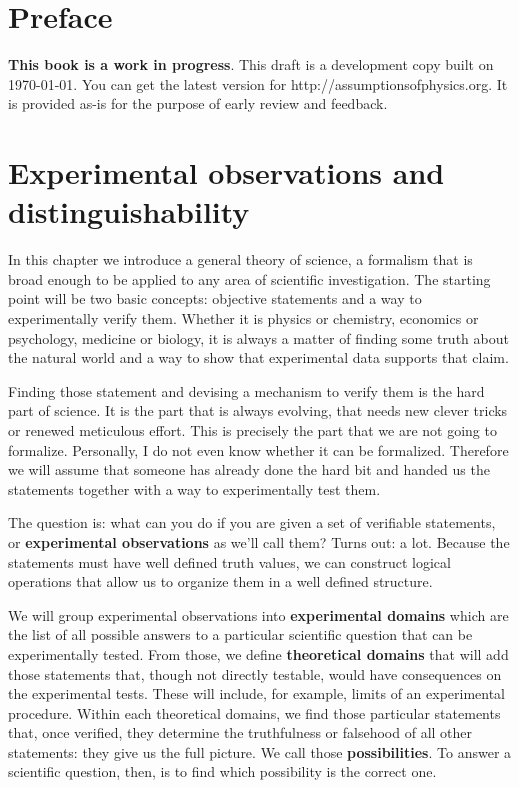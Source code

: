 \documentclass[11pt,letterpaper,fleqn]{memoir} %
\begin{document}
\chapter*{Preface}

\textbf{This book is a work in progress}. This draft is a development copy built on \today. You can get the latest version for http://assumptionsofphysics.org. It is provided as-is for the purpose of early review and feedback. 

\chapter{Experimental observations and distinguishability}

In this chapter we introduce a general theory of science, a formalism that is broad enough to be applied to any area of scientific investigation. The starting point will be two basic concepts: objective statements and a way to experimentally verify them. Whether it is physics or chemistry, economics or psychology, medicine or biology, it is always a matter of finding some truth about the natural world and a way to show that experimental data supports that claim.

Finding those statement and devising a mechanism to verify them is the hard part of science. It is the part that is always evolving, that needs new clever tricks or renewed meticulous effort. This is precisely the part that we are not going to formalize. Personally, I do not even know whether it can be formalized. Therefore we will assume that someone has already done the hard bit and handed us the statements together with a way to experimentally test them.

The question is: what can you do if you are given a set of verifiable statements, or \textbf{experimental observations} as we'll call them? Turns out: a lot. Because the statements must have well defined truth values, we can construct logical operations that allow us to organize them in a well defined structure.

We will group experimental observations into \textbf{experimental domains} which are the list of all possible answers to a particular scientific question that can be experimentally tested. From those, we define \textbf{theoretical domains} that will add those statements that, though not directly testable, would have consequences on the experimental tests. These will include, for example, limits of an experimental procedure. Within each theoretical domains, we find those particular statements that, once verified, they determine the truthfulness or falsehood of all other statements: they give us the full picture. We call those \textbf{possibilities}. To answer a scientific question, then, is to find which possibility is the correct one.
\end{document}

